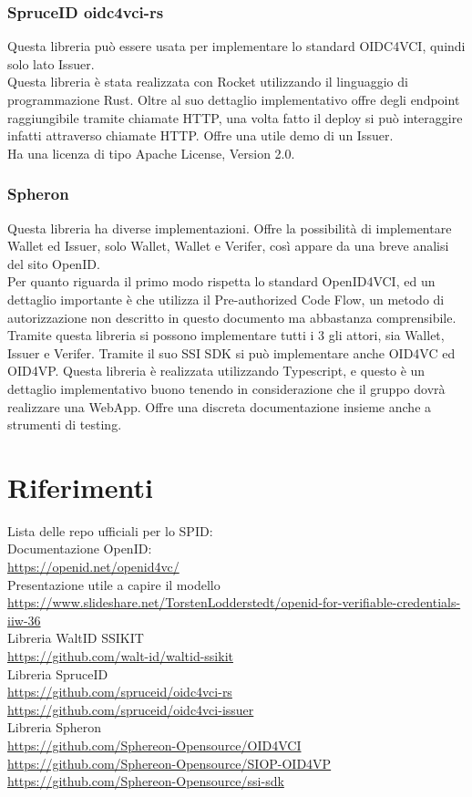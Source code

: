 \subsubsection{SpruceID oidc4vci-rs}
Questa libreria può essere usata per implementare lo standard OIDC4VCI, quindi solo lato Issuer.\\
Questa libreria è stata realizzata con Rocket utilizzando il linguaggio di programmazione Rust.
Oltre al suo dettaglio implementativo offre degli endpoint raggiungibile tramite chiamate HTTP, 
una volta fatto il deploy si può interaggire infatti attraverso chiamate HTTP.
Offre una utile demo di un Issuer.
\\Ha una licenza di tipo  Apache License, Version 2.0.

\subsubsection{Spheron}
Questa libreria ha diverse implementazioni.
Offre la possibilità di implementare Wallet ed Issuer, solo Wallet, Wallet e Verifer, così appare da una breve analisi del sito OpenID.\\
Per quanto riguarda il primo modo rispetta lo standard OpenID4VCI, ed un dettaglio importante
è che utilizza il Pre-authorized Code Flow, un metodo di autorizzazione non descritto in questo documento ma abbastanza comprensibile.\\
Tramite questa libreria si possono implementare tutti i 3 gli attori, sia Wallet, Issuer e Verifer.
Tramite il suo SSI SDK si può implementare anche OID4VC ed OID4VP.
Questa libreria è realizzata utilizzando Typescript, e questo è un dettaglio implementativo buono tenendo in considerazione
che il gruppo dovrà realizzare una WebApp.
Offre una discreta documentazione insieme anche a strumenti di testing.



\section{Riferimenti}
Lista delle repo ufficiali per lo SPID:
\\ Documentazione OpenID:
\\ \url{https://openid.net/openid4vc/}
\\ Presentazione utile a capire il modello
\\ \url{https://www.slideshare.net/TorstenLodderstedt/openid-for-verifiable-credentials-iiw-36}
\\ Libreria WaltID SSIKIT
\\ \url{https://github.com/walt-id/waltid-ssikit}
\\ Libreria SpruceID
\\ \url{https://github.com/spruceid/oidc4vci-rs}
\\ \url{https://github.com/spruceid/oidc4vci-issuer}
\\ Libreria Spheron
\\ \url{https://github.com/Sphereon-Opensource/OID4VCI}
\\ \url{https://github.com/Sphereon-Opensource/SIOP-OID4VP}
\\ \url{https://github.com/Sphereon-Opensource/ssi-sdk}
